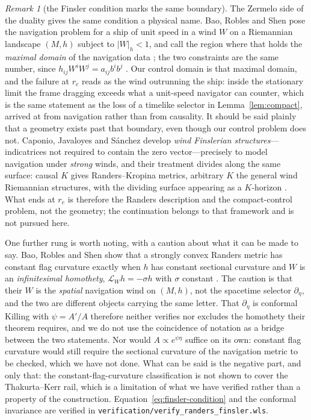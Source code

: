 \documentclass[12pt]{iopart}
\theoremstyle{plain}
\theoremstyle{definition}
\theoremstyle{remark}
\newtheorem{remark}[proposition]{Remark}
\begin{document}
\begin{remark}[the Finsler condition marks the same boundary]
The Zermelo side of the duality gives the same condition a physical name. Bao,
Robles and Shen pose the navigation problem for a ship of unit speed in a wind $W$
on a Riemannian landscape $(M,h)$ subject to $|W|_h<1$, and call the region where
that holds the \emph{maximal domain} of the navigation data
\cite[\S0.1]{BaoRoblesShen}; the two constraints are the same number, since
$h_{ij}W^iW^j=a_{ij}b^ib^j$ \cite[\S2.1]{GibbonsRanders2009}. Our control domain is
that maximal domain, and the failure at $r_e$ reads as the wind outrunning the
ship: inside the stationary limit the frame dragging exceeds what a unit-speed
navigator can counter, which is the same statement as the loss of a timelike
selector in Lemma~\ref{lem:compact}, arrived at from navigation rather than from
causality. It should be said plainly that a geometry exists past that boundary,
even though our control problem does not. Caponio, Javaloyes and S\'anchez develop
\emph{wind Finslerian structures}---indicatrices not required to contain the zero
vector---precisely to model navigation under \emph{strong} winds, and their
treatment divides along the same surface: causal $K$ gives Randers--Kropina
metrics, arbitrary $K$ the general wind Riemannian structures, with the dividing
surface appearing as a $K$-horizon
\cite[\S\S4--5,~8.3]{CaponioWind}. What ends at $r_e$ is therefore the Randers
description and the compact-control problem, not the geometry; the continuation
belongs to that framework and is not pursued here.

One further rung is worth noting, with a caution about what it can be made to
say. Bao, Robles and Shen show that a strongly convex Randers
metric has constant flag curvature exactly when $h$ has constant sectional
curvature and $W$ is an \emph{infinitesimal homothety}, $\mathcal L_Wh=-\sigma h$
with $\sigma$ constant \cite[Thm.~3.1]{BaoRoblesShen}. The caution is that their
$W$ is the \emph{spatial} navigation wind on $(M,h)$, not the spacetime selector
$\partial_\eta$, and the two are different objects carrying the same letter. That
$\partial_\eta$ is conformal Killing with $\psi=A'/A$ therefore neither verifies
nor excludes the homothety their theorem requires, and we do not use the
coincidence of notation as a bridge between the two statements. Nor would
$A\propto e^{\psi\eta}$ suffice on its own: constant flag curvature would still
require the sectional curvature of the navigation metric to be checked, which we
have not done. What can be said is the negative part, and only that: the
constant-flag-curvature classification is not shown to cover the Thakurta--Kerr
rail, which is a limitation of what we have verified rather than a property of
the construction.
Equation~\eqref{eq:finsler-condition} and the conformal invariance are verified in
\texttt{verification/verify\_randers\_finsler.wls}.
\end{remark}
\end{document}
